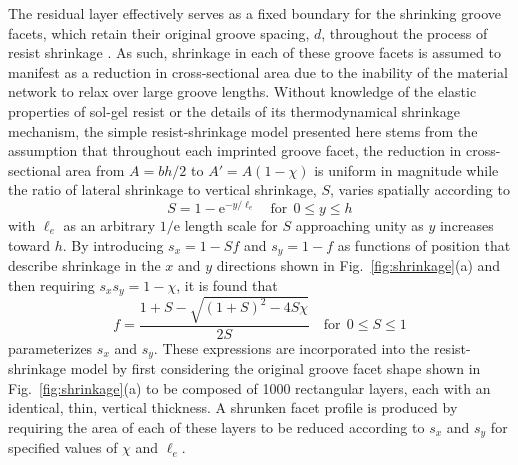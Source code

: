 \documentclass{osa-article}
\begin{document}
The residual layer effectively serves as a fixed boundary for the shrinking groove facets, which retain their original groove spacing, $d$, throughout the process of resist shrinkage \cite{Horiba_2012}. 
As such, shrinkage in each of these groove facets is assumed to manifest as a reduction in cross-sectional area due to the inability of the material network to relax over large groove lengths.  
Without knowledge of the elastic properties of sol-gel resist or the details of its thermodynamical shrinkage mechanism, the simple resist-shrinkage model presented here stems from the assumption that throughout each imprinted groove facet, the reduction in cross-sectional area from $A = b h / 2$ to $A' = A \left( 1 - \chi \right)$ is uniform in magnitude while the ratio of lateral shrinkage to vertical shrinkage, $S$, varies spatially according to 
\begin{equation}\label{eq:exp_shrink}
 S = 1 - \mathrm{e}^{- y / \ell_e} \quad \text{for} \ \ 0 \leq y \leq h  
 \end{equation}
with $\ell_e$ as an arbitrary $1 / \mathrm{e}$ length scale for $S$ approaching unity as $y$ increases toward $h$. 
By introducing $s_x = 1 - S f$ and $s_y = 1 - f$ as functions of position that describe shrinkage in the $x$ and $y$ directions shown in Fig.~\ref{fig:shrinkage}(a) and then requiring $s_x s_y = 1 - \chi$, it is found that  
\begin{equation}\label{eq:quad_solution}
 f = \frac{1 + S - \sqrt{(1+S)^2 - 4 S \chi}}{2 S} \quad \text{for} \ \ 0 \leq S \leq 1
 \end{equation}
parameterizes $s_x$ and $s_y$. 
These expressions are incorporated into the resist-shrinkage model by first considering the original groove facet shape shown in Fig.~\ref{fig:shrinkage}(a) to be composed of 1000 rectangular layers, each with an identical, thin, vertical thickness. 
A shrunken facet profile is produced by requiring the area of each of these layers to be reduced according to $s_x$ and $s_y$ for specified values of $\chi$ and $\ell_e$. 
\end{document}
